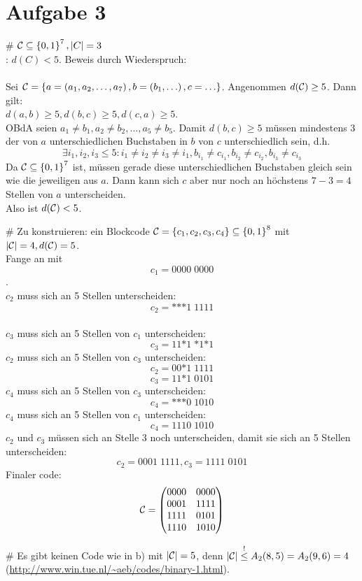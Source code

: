 \section*{Aufgabe 3}
\begin{myList}
# $\mathcal{C} \subseteq\left\lbrace 0,1 \right\rbrace^7, |C|=3$\\
\ZZ: $d(C)< 5$. Beweis durch Wiederspruch:\\\\
Sei $\mathcal{C}=\left\lbrace a=\left( a_1, a_2,\ldots, a_7 \right), b=\left( b_1, \ldots \right), c=\ldots \right\rbrace$. Angenommen $d(\mathcal{C})\geq 5$. Dann gilt:\\
$d(a, b)\geq 5, d(b, c)\geq 5, d(c, a)\geq 5$.\\
OBdA seien $a_1\not=b_1, a_2\not=b_2, \ldots, a_5\not= b_5$. Damit $d(b, c)\geq 5$ müssen mindestens 3 der von $a$ unterschiedlichen Buchstaben in $b$ von $c$ unterschiedlich sein, d.h.
$$\exists i_1, i_2, i_3 \leq 5: i_1\not=i_2\not=i_3\not=i_1, b_{i_1}\not= c_{i_1},   b_{i_2}\not= c_{i_2},   b_{i_3}\not= c_{i_3} $$
Da $\mathcal{C}\subseteq\left\lbrace 0, 1 \right\rbrace^7$ ist, müssen gerade diese unterschiedlichen Buchstaben gleich sein wie die jeweiligen aus $a$. Dann kann sich $c$ aber nur noch an höchstens $7-3=4$ Stellen von $a$ unterscheiden. \\
Also ist $d(\mathcal{C})< 5$.

# Zu konstruieren: ein Blockcode $\mathcal{C}=\left\lbrace c_1, c_2, c_3, c_4 \right\rbrace\subseteq\left\lbrace 0,1 \right\rbrace^8$ mit $|\mathcal{C}|=4, d(\mathcal{C})=5$.   \\
Fange an mit $$c_1=0000\;0000$$.\\
$c_2$ muss sich an 5 Stellen unterscheiden: $$c_2= \mbox{*}\mbox{*}\mbox{*}1\;1111$$\\
$c_3$ muss sich an 5 Stellen von $c_1$ unterscheiden: $$c_3=11\mbox{*}1\;\mbox{*}1\mbox{*}1$$
$c_2$ muss sich an 5 Stellen von $c_3$ unterscheiden: $$c_2=00\mbox{*}1\;1111$$
$$c_3=11\mbox{*}1\;0101$$
$c_4$ muss sich an 5 Stellen von $c_3$ unterscheiden:
$$c_4=\mbox{*}\mbox{*}\mbox{*}0\;1010$$
$c_4$ muss sich an 5 Stellen von $c_1$ unterscheiden:
$$c_4=1110\;1010$$
$c_2$ und $c_3$ müssen sich an Stelle 3 noch unterscheiden, damit sie sich an 5 Stellen unterscheiden:
$$c_2=0001\;1111, c_3=1111\;0101$$
Finaler code:
$$\mathcal{C}=\begin{pmatrix}
0000&0000\\
0001&1111\\
1111&0101\\
1110&1010
\end{pmatrix}$$

# Es gibt keinen Code wie in b) mit $|\mathcal{C}|=5$, denn $|\mathcal{C}|\overset ! \leq A_2(8, 5) = A_2(9, 6) = 4$ \\(\url{http://www.win.tue.nl/~aeb/codes/binary-1.html}).
\end{myList}

